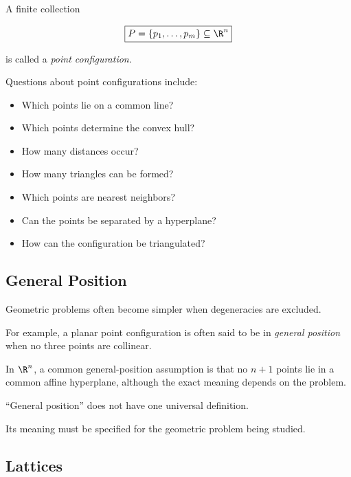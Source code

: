 A finite collection

\[
\boxed{
P=\{p_1,\ldots,p_m\}\subseteq\R^n
}
\]

is called a \emph{point configuration}.

Questions about point configurations include:

\begin{itemize}
    \item Which points lie on a common line?
    \item Which points determine the convex hull?
    \item How many distances occur?
    \item How many triangles can be formed?
    \item Which points are nearest neighbors?
    \item Can the points be separated by a hyperplane?
    \item How can the configuration be triangulated?
\end{itemize}

\subsection{General Position}
\label{subsec:discrete-general-position}

Geometric problems often become simpler when degeneracies are excluded.

For example, a planar point configuration is often said to be in
\emph{general position} when no three points are collinear.

In \(\R^n\), a common general-position assumption is that no \(n+1\) points
lie in a common affine hyperplane, although the exact meaning depends on the
problem.

\begin{warningbox}
``General position'' does not have one universal definition.

Its meaning must be specified for the geometric problem being studied.
\end{warningbox}

\subsection{Lattices}
\label{subsec:discrete-lattices}

